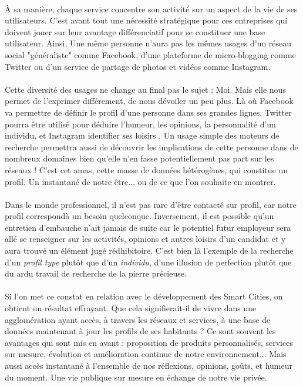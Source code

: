 \paragraph{} À sa manière, chaque service concentre son activité sur un aspect de la vie de ses utilisateurs. C'est avant 
tout une nécessité stratégique pour ces entreprises qui doivent jouer sur leur avantage différenciatif pour se constituer
une base utilisateur. Ainsi, Une même personne n'aura pas les mêmes usages d'un réseau social "généraliste" comme Facebook, 
d'une plateforme de micro-blogging comme Twitter ou d'un service de partage de photos et vidéos comme Instagram.

\paragraph{} Cette diversité des usages ne change au final pas le sujet : Moi. Mais elle nous permet de l'exprimer différement, 
de nous dévoiler un peu plus. Là où Facebook va permettre de définir le profil d'une personne dans ses grandes lignes, 
Twitter pourra être utilisé pour déduire l'humeur, les opinions, la personnalité d'un individu, et Instagram identifier
ses loisirs \cite{SocialMedia4}. Un usage simple des moteurs de recherche permettra aussi de découvrir les implications
de cette personne dans de nombreux domaines bien qu'elle n'en fasse potentiellement pas part sur les réseaux ! C'est cet 
amas, cette masse de données hétérogènes, qui constitue un profil. Un instantané de notre être... ou de ce que l'on souhaite
en montrer.

\paragraph{} Dans le monde professionnel, il n'est pas rare d'être contacté \guillemotleft sur profil\guillemotright,
car \guillemotleft notre profil correspond\guillemotright à un besoin quelconque. Inversement, il est possible qu'un
entretien d'embauche n'ait jamais de suite car le potentiel futur employeur sera allé se renseigner sur les activités, 
opinions et autres loisirs d'un candidat et y aura trouvé un élément jugé rédhibitoire. C'est bien là l'exemple de la 
recherche d'un \emph{profil type} plutôt que d'un \emph{individu}, d'une illusion de perfection plutôt que du ardu travail
de recherche de la pierre précieuse.

\paragraph{} Si l'on met ce constat en relation avec le développement des Smart Cities, on obtient un résultat
effrayant. Que cela signifierait-il de vivre dans une agglomération ayant accès, à travers les réseaux et services, à une
base de données maintenant à jour les profils de ses habitants ? Ce sont souvent les avantages qui sont mis en avant : 
proposition de produits personnalisés, services sur mesure, évolution et amélioration continue de notre environnement...
Mais aussi accès instantané à l'ensemble de nos réflexions, opinions, goûts, et humeur du moment. Une vie publique sur 
mesure en échange de notre vie privée.

